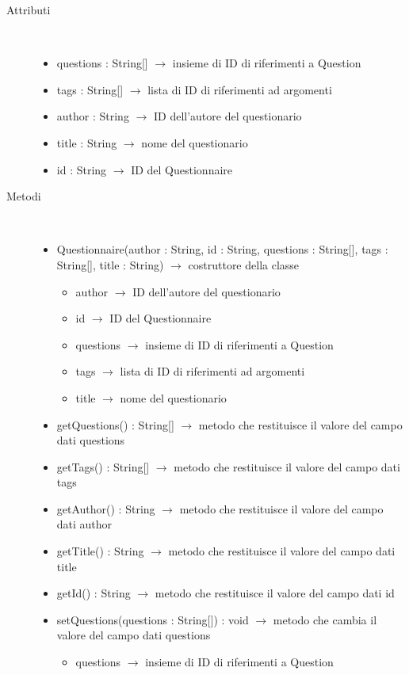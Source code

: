 \begin{description}
\item[Attributi] \hfill \\
\vspace{-7mm}
\begin{itemize}
	\item questions : String[] $\rightarrow$ insieme di ID di riferimenti a Question
	\item tags : String[] $\rightarrow$ lista di ID di riferimenti ad argomenti 
	\item author : String $\rightarrow$ ID dell'autore del questionario
	\item title : String $\rightarrow$ nome del questionario
	\item id : String $\rightarrow$ ID del Questionnaire
\end{itemize}

\item[Metodi] \hfill \\
\vspace{-7mm}
\begin{itemize}
	\item Questionnaire(author : String, id : String, questions : String[], tags : String[], title : String) $\rightarrow$ costruttore della classe\begin{itemize}
		\item author $\rightarrow$ ID dell'autore del questionario
		\item id $\rightarrow$ ID del Questionnaire
		\item questions $\rightarrow$ insieme di ID di riferimenti a Question
		\item tags $\rightarrow$ lista di ID di riferimenti ad argomenti
		\item title $\rightarrow$ nome del questionario
	\end{itemize}
	
	\item getQuestions() : String[] $\rightarrow$ metodo che restituisce il valore del campo dati questions
	\item getTags() : String[] $\rightarrow$ metodo che restituisce il valore del campo dati tags
	\item getAuthor() : String $\rightarrow$ metodo che restituisce il valore del campo dati author
	\item getTitle() : String $\rightarrow$ metodo che restituisce il valore del campo dati title
	\item getId() : String $\rightarrow$ metodo che restituisce il valore del campo dati id
	\item setQuestions(questions : String[]) : void $\rightarrow$ metodo che cambia il valore del campo dati questions\begin{itemize}
		\item questions $\rightarrow$ insieme di ID di riferimenti a Question
	\end{itemize}
	

\end{itemize}
\end{description}
